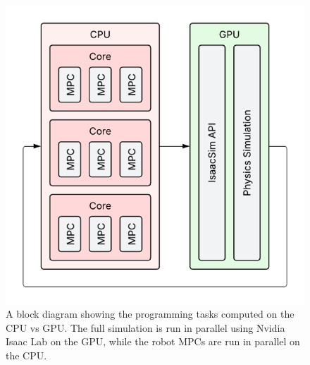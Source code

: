 \begin{figure}
  \centering
  \includegraphics[width=0.5\linewidth]{images/diagrams/processing-flow.png}
  \caption{A block diagram showing the programming tasks computed on the CPU vs GPU. The full simulation is run in parallel using Nvidia Isaac Lab on the GPU, while the robot MPCs are run in parallel on the CPU.}
  \label{fig:diagram-processing-flow}
\end{figure}

